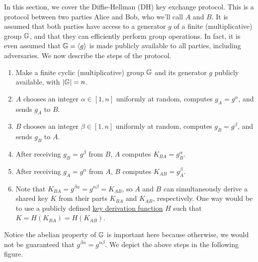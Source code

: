 In this section, we cover the Diffie-Hellman (DH) key exchange protocol. 
This is a protocol between two parties Alice and Bob, who we'll call $A$ and $B$. 
It is assumed that both parties have access to a generator $g$ of a finite 
(multiplicative) group $\mathbb{G}$, and that they can efficiently perform group operations. 
In fact, it is even assumed that $\mathbb{G} = \langle g \rangle$ is made publicly 
available to all parties, including adversaries. We now describe the steps of 
the protocol. 

\begin{enumerate}
    \item Make a finite cyclic (multiplicative) group $\mathbb{G}$ and its generator $g$ 
          publicly available, with $|\mathbb{G}| = n$. 
    \item $A$ chooses an integer $\alpha \in [1, n]$ uniformly at random, computes 
          $g_A = g^\alpha$, and sends $g_A$ to $B$. 
    \item $B$ chooses an integer $\beta \in [1, n]$ uniformly at random, computes 
          $g_B = g^\beta$, and sends $g_B$ to $A$. 
    \item After receiving $g_B = g^\beta$ from $B$, $A$ computes $K_{BA} = g_B^\alpha$. 
    \item After receiving $g_A = g^\alpha$ from $A$, $B$ computes $K_{AB} = g_A^\beta$. 
    \item Note that $K_{BA} = g^{\beta\alpha} = g^{\alpha\beta} = K_{AB}$, so $A$ and 
          $B$ can simultaneously derive a shared key $K$ from their parts $K_{BA}$
          and $K_{AB}$, respectively. One way would be to use a publicly defined
          \href{https://en.wikipedia.org/wiki/Key_derivation_function}{key 
          derivation function} $H$ such that $K = H(K_{BA}) = H(K_{AB})$. 
\end{enumerate}

Notice the abelian property of $\mathbb{G}$ is important here because otherwise, we would 
not be guaranteed that $g^{\beta\alpha} = g^{\alpha\beta}$. 
We depict the above steps in the following figure. 

\begin{center}
\end{center}

